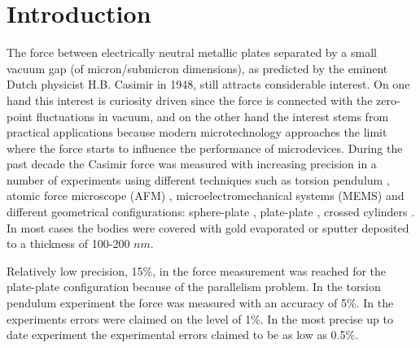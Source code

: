 \documentclass[prb]{revtex4}%
\begin{document}
\maketitle

\section{\label{Sec1}Introduction}
The force between electrically neutral metallic plates separated by
a small vacuum gap (of micron/submicron dimensions), as predicted by
the eminent Dutch physicist H.B. Casimir in 1948, still attracts
considerable interest. On one hand this interest is curiosity driven
since the force is connected with the zero-point fluctuations in
vacuum, and on the other hand the interest stems from practical
applications because modern microtechnology approaches the limit
where the force starts to influence the performance of microdevices.
During the past decade the Casimir force was measured with
increasing precision in a number of experiments using different
techniques such as torsion pendulum \cite{Lam97}, atomic force
microscope (AFM) \cite {Moh98,Har00}, microelectromechanical systems
(MEMS) \cite {Cha01,Dec03a,Dec03b,Dec05} and different geometrical
configurations: sphere-plate \cite{Lam97,Har00,Dec03b}, plate-plate
\cite{Bres02}, crossed cylinders \cite {Ede00}. In most cases the
bodies were covered with gold evaporated or sputter deposited to a
thickness of 100-200 $nm$.

Relatively low precision, 15\%, in the force measurement was reached
for the plate-plate configuration \cite{Bres02} because of the
parallelism problem. In the torsion pendulum experiment \cite
{Lam97} the force was measured with an accuracy of 5\%. In the
experiments \cite{Har00,Ede00,Cha01} errors were claimed on the
level of 1\%. In the most precise up to date experiment
\cite{Dec03a,Dec03b,Dec05} the experimental errors claimed to be as
low as 0.5\%.
\end{document}
